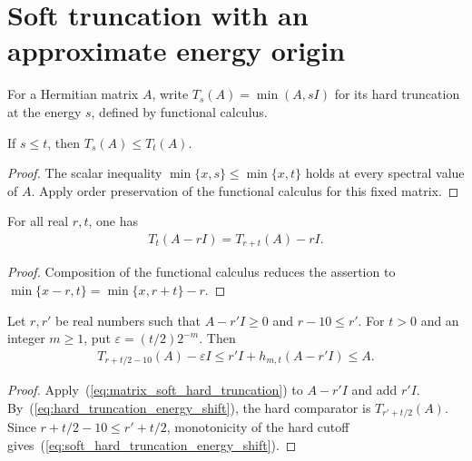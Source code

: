 \section{Soft truncation with an approximate energy origin}

For a Hermitian matrix $A$, write $T_s(A)=\min(A,sI)$ for its hard
truncation at the energy $s$, defined by functional calculus.

\begin{lemma}
    \label{thm:hard_truncation_cutoff_monotone}
    \leanok
    If $s\leq t$, then $T_s(A)\leq T_t(A)$.
\end{lemma}
\begin{proof}\leanok
    The scalar inequality $\min\{x,s\}\leq\min\{x,t\}$ holds at every
    spectral value of $A$. Apply order preservation of the functional
    calculus for this fixed matrix.
\end{proof}

\begin{lemma}
    \label{thm:hard_truncation_energy_shift}
    \leanok
    For all real $r,t$, one has
    \begin{align}
        T_t(A-rI)=T_{r+t}(A)-rI.
        \label{eq:hard_truncation_energy_shift}
    \end{align}
\end{lemma}
\begin{proof}\leanok
    Composition of the functional calculus reduces the assertion to
    $\min\{x-r,t\}=\min\{x,r+t\}-r$.
\end{proof}

\begin{lemma}
    \label{thm:soft_hard_truncation_energy_shift}
    \leanok
    Let $r,r'$ be real numbers such that $A-r'I\geq0$ and $r-10\leq r'$.
    For $t>0$ and an integer $m\geq1$, put $\varepsilon=(t/2)2^{-m}$.
    Then
    \begin{align}
        T_{r+t/2-10}(A)-\varepsilon I
        \leq r'I+h_{m,t}(A-r'I)\leq A.
        \label{eq:soft_hard_truncation_energy_shift}
    \end{align}
\end{lemma}
\begin{proof}\leanok
    Apply~(\ref{eq:matrix_soft_hard_truncation}) to $A-r'I$ and add $r'I$.
    By~(\ref{eq:hard_truncation_energy_shift}), the hard comparator is
    $T_{r'+t/2}(A)$. Since $r+t/2-10\leq r'+t/2$, monotonicity of the
    hard cutoff gives~(\ref{eq:soft_hard_truncation_energy_shift}).
\end{proof}

